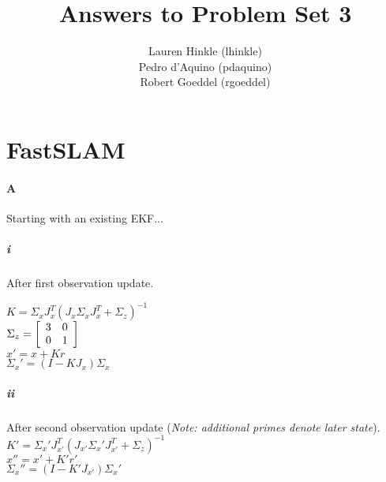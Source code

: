 \documentclass[12pt]{article}
\title{Answers to Problem Set 3}
\author{
	Lauren Hinkle (lhinkle)\\
	Pedro d'Aquino (pdaquino)\\
	Robert Goeddel (rgoeddel)}
\begin{document}
\maketitle
\pagebreak

\section{FastSLAM}

\paragraph{A}
Starting with an existing EKF...
\subparagraph{i}
After first observation update.

$K = \Sigma_x J_x^T(J_x \Sigma_x J_x^T + \Sigma_z)^{-1} $ \\
$\Sigma_z = \left[ \begin{array}{c c}
3 & 0 \\
0 & 1 \\
\end{array} \right]$ \\
$x' = x + Kr$ \\
$\Sigma_x' = (I - KJ_x) \Sigma_x$ \\

\subparagraph{ii}
After second observation update (\emph{Note: additional primes denote
    later state}).
$K' = \Sigma_x' J_{x'}^T(J_{x'} \Sigma_x' J_{x'}^T + \Sigma_z)^{-1} $ \\
$x'' = x' + K'r'$ \\
$\Sigma_x'' = (I - K'J_{x'}) \Sigma_x'$ \\
\end{document}
